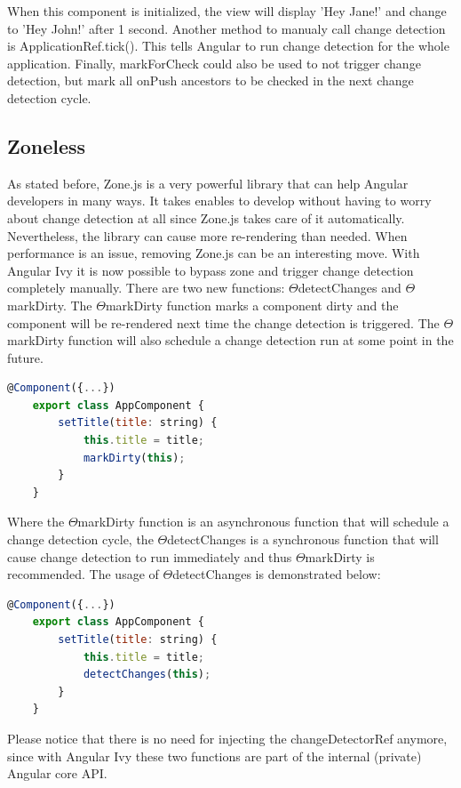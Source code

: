 When this component is initialized, the view will display 'Hey Jane!' and change to 'Hey John!' after 1 second. Another method to manualy call change detection is ApplicationRef.tick(). This tells Angular to run change detection for the whole application. Finally, markForCheck could also be used to not trigger change detection, but mark all onPush ancestors to be checked in the next change detection cycle.

\subsection{Zoneless}
As stated before, Zone.js is a very powerful library that can help Angular developers in many ways. It takes enables to develop without having to worry about change detection at all since Zone.js takes care of it automatically. Nevertheless, the library can cause more re-rendering than needed. When performance is an issue, removing Zone.js can be an interesting move. With Angular Ivy it is now possible to bypass zone and trigger change detection completely manually. There are two new functions: \(\Theta\)detectChanges and \(\Theta\)markDirty. The \(\Theta\)markDirty function marks a component dirty and the component will be re-rendered next time the change detection is triggered. The \(\Theta\)markDirty function will also schedule a change detection run at some point in the future.
\autocite{Buomprisco2019}

\begin{lstlisting}[language=JavaScript]
	@Component({...})
	export class AppComponent {
		setTitle(title: string) {
			this.title = title;
			markDirty(this);
		}
	}
\end{lstlisting}
\autocite{Buomprisco2019}

Where the \(\Theta\)markDirty function is an asynchronous function that will schedule a change detection cycle, the \(\Theta\)detectChanges is a synchronous function that will cause change detection to run immediately and thus \(\Theta\)markDirty is recommended. The usage of \(\Theta\)detectChanges is demonstrated below:

\begin{lstlisting}[language=JavaScript]
	@Component({...})
	export class AppComponent {
		setTitle(title: string) {
			this.title = title;
			detectChanges(this);
		}
	}
\end{lstlisting}
\autocite{Buomprisco2019}

Please notice that there is no need for injecting the changeDetectorRef anymore, since with Angular Ivy these two functions are part of the internal (private) Angular core API.

